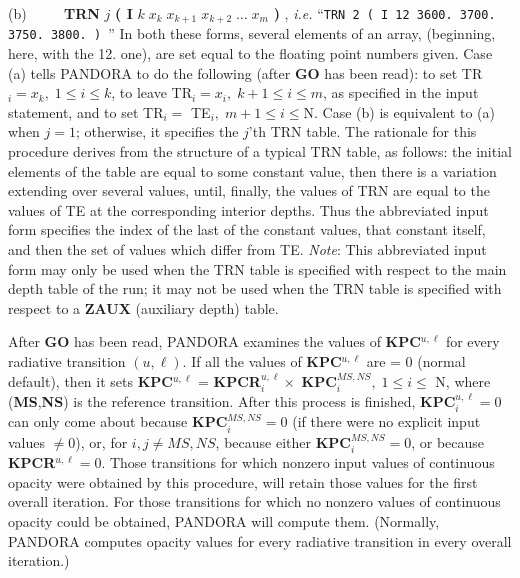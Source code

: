 (b) $\qquad$
{\bf TRN} $j$ {\bf ( I} $k \; x_k \; x_{k+1} \; x_{k+2} \; \ldots 
\; x_m$ {\bf ) },\np
{\it i.e.} ``{\tt TRN 2 ( I 12 3600. 3700. 3750. 3800. ) }''\np
In both these forms, several elements of an array, (beginning, here,  with
the 12. one), are set equal to the floating point numbers given.
\np
Case (a) tells PANDORA to do the following (after {\bf GO} has been read):
\np
to set TR$_i = x_k, \; 1 \leq i \leq k$, to leave TR$_i = x_i,
\; k+1 \leq i \leq m$, as specified in the input statement, and to set
TR$_i = $ TE$_i, \; m+1 \leq i \leq $N. \np
Case (b) is equivalent to (a) when $j = 1$; otherwise, it specifies the
$j$'th TRN table. \np
The rationale for this procedure derives from the structure of a typical
TRN table, as follows: the initial elements of the table are equal to
some constant value, then there is a variation extending over several
values, until, finally, the values of TRN are equal to the values of
TE at the corresponding interior depths. Thus the abbreviated input form
specifies the index of the last of the constant values, that constant
itself, and then the set of values which differ from TE. \np
{\it Note}: 
This abbreviated input form may only be used when the TRN
table is specified with respect to the main depth table of the run;
it may not be used when the TRN table is specified with respect to a
{\bf ZAUX} (auxiliary depth) table.
\blankline
\blankline
\centerline{}
\space \noindent
After {\bf GO} has been read, PANDORA examines the values of 
{\bf KPC}$^{u,\ell}$ for every radiative transition $(u,\ell)$. 
If all the values of {\bf KPC}$^{u,\ell}$ are = 0 (normal default), 
then it sets 
{\bf KPC}$^{u,\ell}$ = {\bf KPCR}$^{u,\ell}_i \times $ {\bf KPC}$^{MS,NS}_i,
\; 1 \leq i \leq $ N, where ({\bf MS},{\bf NS}) is the reference transition.
After this process is finished, {\bf KPC}$^{u,\ell}_i = 0$
can only come about because {\bf KPC}$^{MS,NS}_i = 0$ (if there were
no explicit input values $\neq 0$), or, for $i,j \neq MS,NS$, because
either {\bf KPC}$^{MS,NS}_i = 0$, or because {\bf KPCR}$^{u,\ell} = 0$. \np
Those transitions for which nonzero input values of continuous opacity
were obtained by this procedure, will retain those values for the
first overall iteration. For those transitions for which no
nonzero values of continuous opacity could be obtained, PANDORA will
compute them. (Normally, PANDORA computes opacity values for
every radiative transition in every overall iteration.)
\ej
\centerline{}
